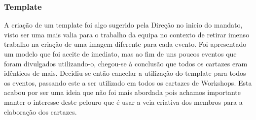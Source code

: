 
\subsubsection{Template}

A criação de um template foi algo sugerido pela Direção no inicio do mandato, visto ser uma mais valia para o trabalho da equipa no contexto de retirar imenso trabalho na criação de uma imagem diferente para cada evento. Foi apresentado um modelo que foi aceite de imediato, mas ao fim de uns poucos eventos que foram divulgados utilizando-o, chegou-se à conclusão que todos os cartazes eram idênticos de mais. Decidiu-se então cancelar a utilização do template para todos os eventos, passando este a ser utilizado em todos os cartazes de Workshops. Esta acabou por ser uma ideia que não foi mais abordada pois achamos importante manter o interesse deste pelouro que é usar a veia criativa dos membros para a elaboração dos cartazes.